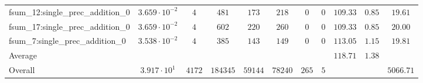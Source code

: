 \begin{tabular}{|l|c|c|c|c|c|c|c|c|c|c|}
fsum\_12:single\_prec\_addition\_0             & $ 3.659 \cdot 10^{-2} $ & $ 4      $ & $ 481    $ & $ 173   $ & $ 218   $ & $ 0   $ & $ 0 $ & $ 109.33      $ & $ 0.85    $ & $ 19.61   $ \\
fsum\_17:single\_prec\_addition\_0             & $ 3.659 \cdot 10^{-2} $ & $ 4      $ & $ 602    $ & $ 220   $ & $ 260   $ & $ 0   $ & $ 0 $ & $ 109.33      $ & $ 0.85    $ & $ 20.00   $ \\
fsum\_7:single\_prec\_addition\_0              & $ 3.538 \cdot 10^{-2} $ & $ 4      $ & $ 385    $ & $ 143   $ & $ 149   $ & $ 0   $ & $ 0 $ & $ 113.05      $ & $ 1.15    $ & $ 19.81   $ \\
\hline
Average                                        & $                     $ & $        $ & $        $ & $       $ & $       $ & $     $ & $   $ & $ 118.71      $ & $ 1.38    $ & $         $ \\
\hline
Overall                                        & $ 3.917 \cdot 10^{1}  $ & $ 4172   $ & $ 184345 $ & $ 59144 $ & $ 78240 $ & $ 265 $ & $ 5 $ & $             $ & $         $ & $ 5066.71 $ \\
\hline
\end{tabular}
